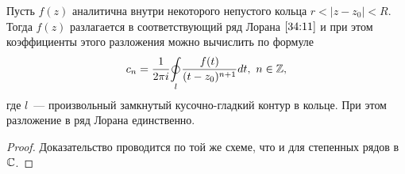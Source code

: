 \documentclass[../../main.tex]{subfiles}
\begin{document}
\begin{thm}
	Пусть $ f(z) $ аналитична внутри некоторого непустого кольца
	$ r < |z - z_0| < R $.
	Тогда $ f(z) $ разлагается в соответствующий ряд Лорана $ 
	\eqref{34:11} $ и при этом коэффициенты этого разложения можно вычислить по 
	формуле
	\begin{equation}\label{34:12}
		c_n = \frac{1}{2 \pi i} \underset{l}\oint\frac{f(t)}{(t - z_0)^{n + 1}} 
		dt,\ n \in \mathbb{Z},
	\end{equation}
	где $ l $~--- произвольный замкнутый кусочно-гладкий контур в кольце. При 
	этом разложение в ряд Лорана единственно.
\end{thm}

\begin{proof}
	Доказательство проводится по той же схеме, что и для степенных рядов в $\mathbb{C}$.
\end{proof}
\end{document}
